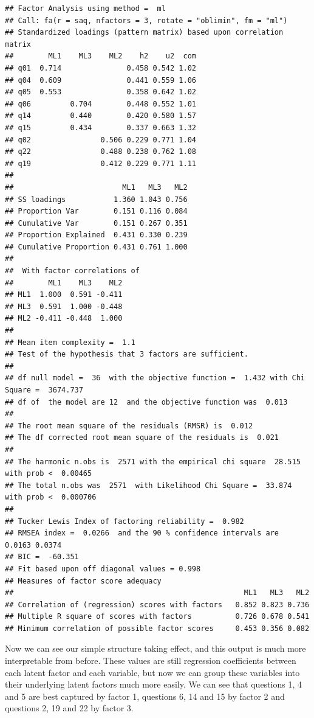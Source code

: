 \documentclass[
]{book}
\begin{document}
\begin{verbatim}
## Factor Analysis using method =  ml
## Call: fa(r = saq, nfactors = 3, rotate = "oblimin", fm = "ml")
## Standardized loadings (pattern matrix) based upon correlation matrix
##        ML1    ML3    ML2    h2    u2  com
## q01  0.714               0.458 0.542 1.02
## q04  0.609               0.441 0.559 1.06
## q05  0.553               0.358 0.642 1.02
## q06         0.704        0.448 0.552 1.01
## q14         0.440        0.420 0.580 1.57
## q15         0.434        0.337 0.663 1.32
## q02                0.506 0.229 0.771 1.04
## q22                0.488 0.238 0.762 1.08
## q19                0.412 0.229 0.771 1.11
## 
##                         ML1   ML3   ML2
## SS loadings           1.360 1.043 0.756
## Proportion Var        0.151 0.116 0.084
## Cumulative Var        0.151 0.267 0.351
## Proportion Explained  0.431 0.330 0.239
## Cumulative Proportion 0.431 0.761 1.000
## 
##  With factor correlations of 
##        ML1    ML3    ML2
## ML1  1.000  0.591 -0.411
## ML3  0.591  1.000 -0.448
## ML2 -0.411 -0.448  1.000
## 
## Mean item complexity =  1.1
## Test of the hypothesis that 3 factors are sufficient.
## 
## df null model =  36  with the objective function =  1.432 with Chi Square =  3674.737
## df of  the model are 12  and the objective function was  0.013 
## 
## The root mean square of the residuals (RMSR) is  0.012 
## The df corrected root mean square of the residuals is  0.021 
## 
## The harmonic n.obs is  2571 with the empirical chi square  28.515  with prob <  0.00465 
## The total n.obs was  2571  with Likelihood Chi Square =  33.874  with prob <  0.000706 
## 
## Tucker Lewis Index of factoring reliability =  0.982
## RMSEA index =  0.0266  and the 90 % confidence intervals are  0.0163 0.0374
## BIC =  -60.351
## Fit based upon off diagonal values = 0.998
## Measures of factor score adequacy             
##                                                     ML1   ML3   ML2
## Correlation of (regression) scores with factors   0.852 0.823 0.736
## Multiple R square of scores with factors          0.726 0.678 0.541
## Minimum correlation of possible factor scores     0.453 0.356 0.082
\end{verbatim}

Now we can see our simple structure taking effect, and this output is much more interpretable from before. These values are still regression coefficients between each latent factor and each variable, but now we can group these variables into their underlying latent factors much more easily. We can see that questions 1, 4 and 5 are best captured by factor 1, questions 6, 14 and 15 by factor 2 and questions 2, 19 and 22 by factor 3.
\end{document}
